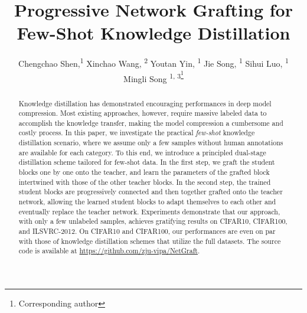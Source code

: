 \documentclass[letterpaper]{article} %
\title{Progressive Network Grafting for Few-Shot Knowledge Distillation}
\author {
    Chengchao Shen,\textsuperscript{\rm 1}
    Xinchao Wang, \textsuperscript{\rm 2}
    Youtan Yin, \textsuperscript{\rm 1}
    Jie Song, \textsuperscript{\rm 1}
    Sihui Luo, \textsuperscript{\rm 1} \\
    Mingli Song \textsuperscript{\rm 1, 3\thanks{Corresponding author}} \\
}
\begin{document}
\maketitle

\begin{abstract}
Knowledge distillation has demonstrated encouraging performances in deep model compression. 
Most existing approaches, however, require massive labeled data to accomplish the knowledge transfer,  making the model compression a cumbersome and costly process.
In this paper, we investigate the practical \emph{few-shot} knowledge distillation scenario, 
where we assume only a few samples without human annotations 
are available for each category. 
To this end, we introduce a principled dual-stage distillation 
scheme tailored for few-shot data. In the first step, we
graft the student blocks one by one onto the teacher, 
and learn the parameters of the grafted block 
intertwined with those of the other teacher blocks. 
In the second step, the trained student blocks are progressively connected and then together grafted onto the teacher network, allowing the learned student blocks to adapt themselves to each other and eventually replace the teacher network. 
Experiments demonstrate that our approach, 
with only a few unlabeled samples,
achieves gratifying results on CIFAR10, CIFAR100, and ILSVRC-2012.
On CIFAR10 and CIFAR100, our performances are even
on par with those of knowledge distillation schemes
that utilize the full datasets.
The source code is available at \url{https://github.com/zju-vipa/NetGraft}. 
\end{abstract}
\end{document}
